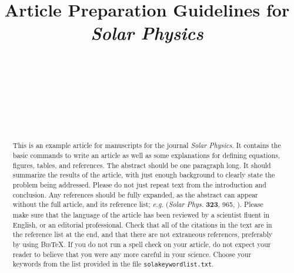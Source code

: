\documentclass[namedreferences]{solarphysics}
\newcommand{\BibTeX}{\textsc{Bib}\TeX}
\newcommand{\solphys}{{\it Solar Phys.}}
\begin{document}
\begin{article}
\begin{opening}

\title{Article Preparation Guidelines for {\it Solar Physics}}

\author[addressref={aff1,aff2,aff3},email={e-mail.a@mail.com}]{~}
\author[addressref=aff1,email={e-mail.b@mail.com}]{~}
\author[addressref=aff2,corref,email={e-mail.c@mail.com}]{~}
\author[addressref=aff3]{~}
\address[id=aff1]{First very very very very very very very very very
 very very very very very very very very very very very very very very very very very very long affiliation and address}
\address[id=aff2]{Institution, City, State, Country}
\address[id=aff3]{Third affiliation and address}


\begin{abstract}
This is an example article for manuscripts for the journal {\it Solar 
Physics}. It contains the basic commands to write an article as well 
as some explanations for defining equations, figures, tables,
and references.    
The abstract should be one paragraph long.  It should summarize
the results of the article, with just enough background to clearly state the
problem being addressed.
Please do not just repeat text from the introduction and conclusion.
Any references should be fully expanded, as the abstract can appear 
without the full article, and its reference list; 
{\it e.g.} \citeauthor{Dupont07} (\solphys{} \textbf{323}, 965, 
\citeyear{Dupont07}).
Please make sure that the language of the article has been reviewed by a
scientist fluent in English, or an editorial professional.
Check that all of the citations in the text are in the reference list at the
end, and that there are not extraneous references, preferably by using 
\BibTeX . If you do not run a spell check on your article, do not expect 
your reader to believe that you were any more careful in your science. 
Choose your keywords from the list provided in the file 
\texttt{sola\us keyword\us list.txt}.  
\end{abstract}
\end{opening}


\end{article}
\end{document}
